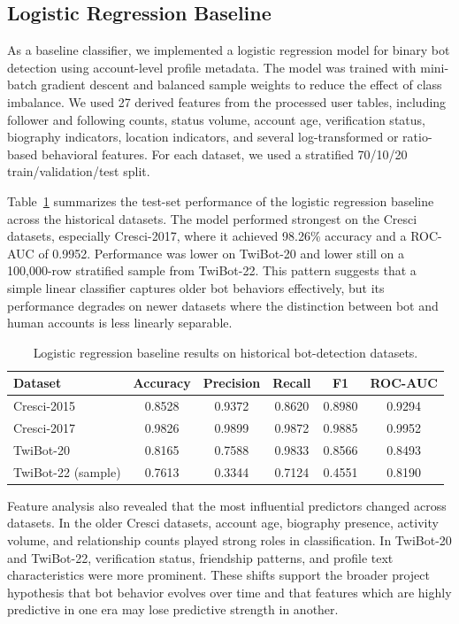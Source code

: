 \subsection{Logistic Regression Baseline}

As a baseline classifier, we implemented a logistic regression model for binary bot detection using account-level profile metadata. The model was trained with mini-batch gradient descent and balanced sample weights to reduce the effect of class imbalance. We used 27 derived features from the processed user tables, including follower and following counts, status volume, account age, verification status, biography indicators, location indicators, and several log-transformed or ratio-based behavioral features. For each dataset, we used a stratified 70/10/20 train/validation/test split.

Table~\ref{tab:logreg-results} summarizes the test-set performance of the logistic regression baseline across the historical datasets. The model performed strongest on the Cresci datasets, especially Cresci-2017, where it achieved 98.26\% accuracy and a ROC-AUC of 0.9952. Performance was lower on TwiBot-20 and lower still on a 100{,}000-row stratified sample from TwiBot-22. This pattern suggests that a simple linear classifier captures older bot behaviors effectively, but its performance degrades on newer datasets where the distinction between bot and human accounts is less linearly separable.

\begin{table}[t]
\centering
\caption{Logistic regression baseline results on historical bot-detection datasets.}
\label{tab:logreg-results}
\begin{tabular}{lccccc}
\hline
Dataset & Accuracy & Precision & Recall & F1 & ROC-AUC \\
\hline
Cresci-2015 & 0.8528 & 0.9372 & 0.8620 & 0.8980 & 0.9294 \\
Cresci-2017 & 0.9826 & 0.9899 & 0.9872 & 0.9885 & 0.9952 \\
TwiBot-20 & 0.8165 & 0.7588 & 0.9833 & 0.8566 & 0.8493 \\
TwiBot-22 (sample) & 0.7613 & 0.3344 & 0.7124 & 0.4551 & 0.8190 \\
\hline
\end{tabular}
\end{table}

Feature analysis also revealed that the most influential predictors changed across datasets. In the older Cresci datasets, account age, biography presence, activity volume, and relationship counts played strong roles in classification. In TwiBot-20 and TwiBot-22, verification status, friendship patterns, and profile text characteristics were more prominent. These shifts support the broader project hypothesis that bot behavior evolves over time and that features which are highly predictive in one era may lose predictive strength in another.
